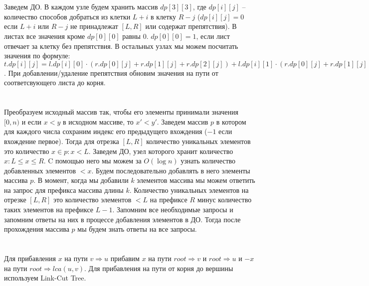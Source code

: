 \documentclass{article}
\begin{document}
\begin{flushleft}

\section{}

Заведем ДО. В каждом узле будем хранить массив $dp[3][3]$, где $dp[i][j]$ -- количество способов добраться из клетки $L + i$ в клетку $R - j$ ($dp[i][j] = 0$ если $L + i$ или $R - j$ не принадлежат $[L, R]$ или содержат препятствия). В листах все значения кроме $dp[0][0]$ равны $0$. $dp[0][0] = 1$, если лист отвечает за клетку без препятствия. В остальных узлах мы можем посчитать значения по формуле: $t.dp[i][j] = l.dp[i][0] \cdot (r.dp[0][j] + r.dp[1][j] + r.dp[2][j]) + l.dp[i][1] \cdot (r.dp[0][j] + r.dp[1][j]) + l.dp[i][2] \cdot r.dp[0][j]$. При добавлении/удаление препятствия обновим значения на пути от соответсвующего листа до корня.

\section{}



\section{}

Преобразуем исходный массив так, чтобы его элементы принимали значения $[0, n)$ и если $x < y$ в исходном массиве, то $x' < y'$. Заведем массив $p$ в котором для каждого числа сохраним индекс его предыдущего вхождения ($-1$ если вхождение первое). Тогда для отрезка $[L, R]$ количество уникальных элементов это количество $x \in p: x < L$. Заведем ДО, узел которого хранит количество $x: L \le x \le R$. C помощью него мы можем за $O(\log n)$ узнать количество добавленных элементов $< x$. Будем последовательно добавлять в него элементы массива $p$. В момент, когда мы добавили $k$ элементов массива мы можем ответить на запрос для префикса массива длины $k$. Количество уникальных элементов на отрезке $[L, R]$ это количество элементов $< L$ на префиксе $R$ минус количество таких элементов на префиксе $L - 1$. Запомним все необходимые запросы и запомним ответы на них в процессе добавления элементов в ДО. Тогда после прохождения массива $p$ мы будем знать ответы на все запросы. 

\section{}

Для прибавления $x$ на пути $v\Rightarrow u$ прибавим $x$ на пути $root\Rightarrow v$ и $root\Rightarrow u$ и $-x$ на пути $root\Rightarrow lca(u, v)$. Для прибавления на пути от корня до вершины используем Link-Cut Tree.


\end{flushleft}
\end{document}
